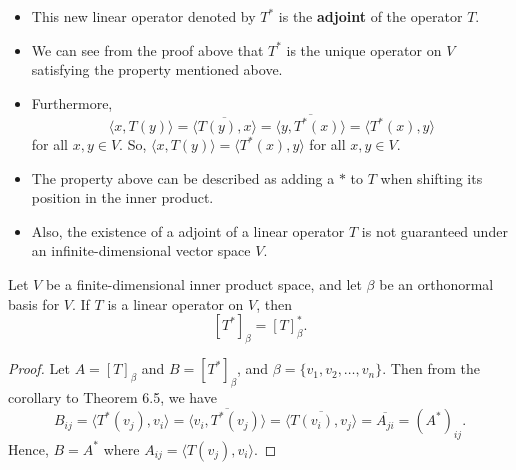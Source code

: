 \begin{itemize}
    \item This new linear operator denoted by \( T^{*} \) is the \textbf{adjoint} of the operator \( T  \).
    \item We can see from the proof above that \( T^{*} \) is the unique operator on \( V  \) satisfying the property mentioned above.
    \item Furthermore, 
        \[  \langle x , T(y) \rangle = \overline{\langle T(y) , x \rangle} = \overline{\langle y , T^{*}(x) \rangle} = \langle T^{*}(x) , y \rangle \]
        for all \( x,y \in V \). So, \( \langle x , T(y) \rangle = \langle T^{*}(x) , y \rangle \) for all \( x,y \in V  \).
    \item The property above can be described as adding a \( *  \) to \( T  \) when shifting its position in the inner product.
    \item Also, the existence of a adjoint of a linear operator \( T  \) is not guaranteed under an infinite-dimensional vector space \( V  \).
\end{itemize}

\begin{theorem}\label{Theorem 6.10}
    Let \( V  \) be a finite-dimensional inner product space, and let \( \beta  \) be an orthonormal basis for \( V  \). If \( T  \) is a linear operator on \( V  \), then
    \[  [T^{*}]_{\beta} = [T]_{\beta}^{*}. \]
\end{theorem}
\begin{proof}
Let \( A = [T]_{\beta} \) and \( B = [T^{*}]_{\beta} \), and \( \beta = \{ {v}_{1}, {v}_{2}, \dots, {v}_{n} \}  \). Then from the corollary to Theorem 6.5, we have
\[  {B}_{ij} = \langle T^{*}({v}_{j}) , {v}_{i} \rangle = \overline{\langle {v}_{i} , T^{*}({v}_{j}) \rangle} = \overline{\langle T({v}_{i}) , {v}_{j} \rangle} = \overline{{A}_{ji}} = (A^{*})_{ij}. \]
Hence, \( B = A^{*} \) where \( {A}_{ij} = \langle T({v}_{j}) , {v}_{i} \rangle \).
\end{proof}


